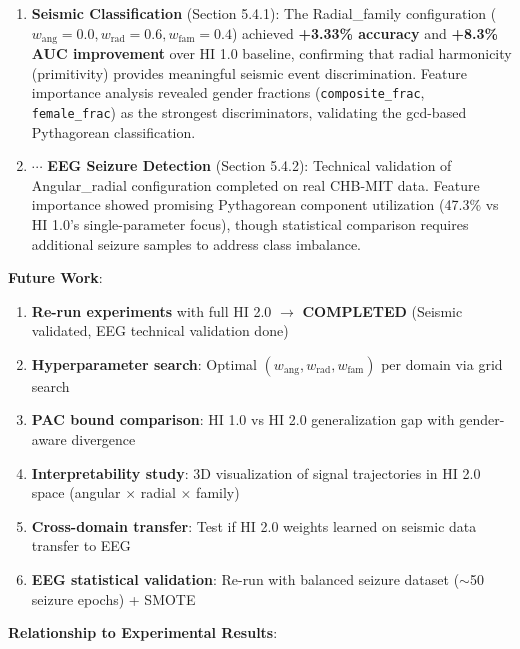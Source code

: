 \documentclass[11pt]{article}
\theoremstyle{remark}
\begin{document}
\begin{enumerate}
\item \checkmark \textbf{Seismic Classification} (Section 5.4.1): The Radial\_family configuration ($w_{\text{ang}}=0.0, w_{\text{rad}}=0.6, w_{\text{fam}}=0.4$) achieved \textbf{+3.33\% accuracy} and \textbf{+8.3\% AUC improvement} over HI 1.0 baseline, confirming that radial harmonicity (primitivity) provides meaningful seismic event discrimination. Feature importance analysis revealed gender fractions (\texttt{composite\_frac}, \texttt{female\_frac}) as the strongest discriminators, validating the gcd-based Pythagorean classification.

\item $\cdots$ \textbf{EEG Seizure Detection} (Section 5.4.2): Technical validation of Angular\_radial configuration completed on real CHB-MIT data. Feature importance showed promising Pythagorean component utilization (47.3\% vs HI 1.0's single-parameter focus), though statistical comparison requires additional seizure samples to address class imbalance.
\end{enumerate}

\textbf{Future Work}:
\begin{enumerate}
\item \checkmark \textbf{Re-run experiments} with full HI 2.0 $\to$ \textbf{COMPLETED} (Seismic validated, EEG technical validation done)
\item \textbf{Hyperparameter search}: Optimal $(w_{\text{ang}}, w_{\text{rad}}, w_{\text{fam}})$ per domain via grid search
\item \textbf{PAC bound comparison}: HI 1.0 vs HI 2.0 generalization gap with gender-aware divergence
\item \textbf{Interpretability study}: 3D visualization of signal trajectories in HI 2.0 space (angular $\times$ radial $\times$ family)
\item \textbf{Cross-domain transfer}: Test if HI 2.0 weights learned on seismic data transfer to EEG
\item \textbf{EEG statistical validation}: Re-run with balanced seizure dataset ($\sim$50 seizure epochs) + SMOTE
\end{enumerate}

\textbf{Relationship to Experimental Results}:
\end{document}
